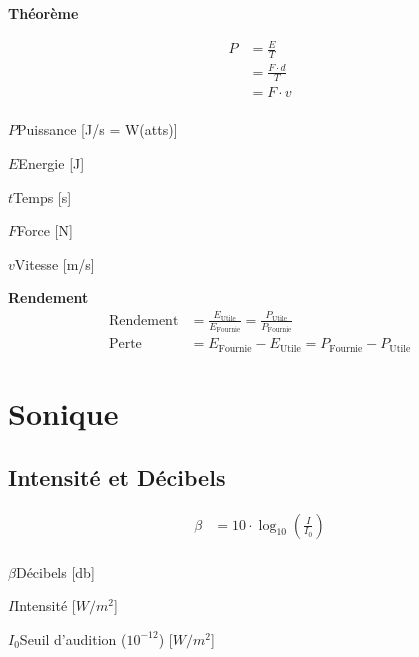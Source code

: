 \documentclass[12pt,a4paper]{article} %
\begin{document}
\begin{mdframed}
	{\large\bfseries Théorème}

	\begin{twocols}
		\begin{align*}
			P &= \frac{E}{T} \\
			  &= \frac{F \cdot d}{T} \\
			  &= F \cdot v \\[1em]
		\end{align*}
	\nextcol
		\begin{vardef}
			\item{$P$}{Puissance [J/s = W(atts)]}
			\item{$E$}{Energie [J]}
			\item{$t$}{Temps [s]}
			\item{$F$}{Force [N]}
			\item{$v$}{Vitesse [m/s]}
		\end{vardef}
	\end{twocols}
\end{mdframed}
\vspace{1em}
\begin{mdframed}
	{\large\bfseries Rendement}
	\begin{align*}
		\text{Rendement} &= \frac{E_\text{Utile}}{E_\text{Fournie}} = \frac{P_\text{Utile}}{P_\text{Fournie}} \\[1em]
		\text{Perte} &= E_\text{Fournie} - E_\text{Utile} = P_\text{Fournie} - P_\text{Utile}
	\end{align*}

\end{mdframed}

\newpage

\section{Sonique}

\subsection{Intensité et Décibels}
\begin{twocols}
	\begin{align*}
		\beta &= 10 \cdot \log_{10}\left(\frac{I}{I_0}\right) \\
	\end{align*}
\nextcol
	\begin{vardef}
		\item{$\beta$}{Décibels [db]}
		\item{$I$}{Intensité [$W/m^2$]}
		\item{$I_0$}{Seuil d'audition ($10^{-12}$) [$W/m^2$]}
	\end{vardef}
\end{twocols}
\end{document}
